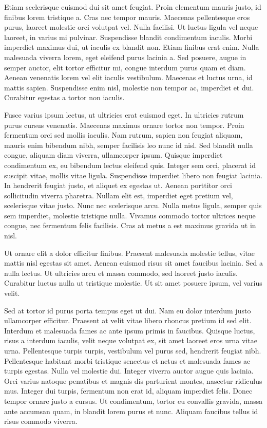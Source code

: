 Etiam scelerisque euismod dui sit amet feugiat. Proin elementum mauris justo, id finibus lorem tristique a. Cras nec tempor mauris. Maecenas pellentesque eros purus, laoreet molestie orci volutpat vel. Nulla facilisi. Ut luctus ligula vel neque laoreet, in varius mi pulvinar. Suspendisse blandit condimentum iaculis. Morbi imperdiet maximus dui, ut iaculis ex blandit non. Etiam finibus erat enim. Nulla malesuada viverra lorem, eget eleifend purus lacinia a. Sed posuere, augue in semper auctor, elit tortor efficitur mi, congue interdum purus quam et diam. Aenean venenatis lorem vel elit iaculis vestibulum. Maecenas et luctus urna, id mattis sapien. Suspendisse enim nisl, molestie non tempor ac, imperdiet et dui. Curabitur egestas a tortor non iaculis.

Fusce varius ipsum lectus, ut ultricies erat euismod eget. In ultricies rutrum purus cursus venenatis. Maecenas maximus ornare tortor non tempor. Proin fermentum orci sed mollis iaculis. Nam rutrum, sapien non feugiat aliquam, mauris enim bibendum nibh, semper facilisis leo nunc id nisl. Sed blandit nulla congue, aliquam diam viverra, ullamcorper ipsum. Quisque imperdiet condimentum ex, eu bibendum lectus eleifend quis. Integer sem orci, placerat id suscipit vitae, mollis vitae ligula. Suspendisse imperdiet libero non feugiat lacinia. In hendrerit feugiat justo, et aliquet ex egestas ut. Aenean porttitor orci sollicitudin viverra pharetra. Nullam elit est, imperdiet eget pretium vel, scelerisque vitae justo. Nunc nec scelerisque arcu. Nulla metus ligula, semper quis sem imperdiet, molestie tristique nulla. Vivamus commodo tortor ultrices neque congue, nec fermentum felis facilisis. Cras at metus a est maximus gravida ut in nisl.

Ut ornare elit a dolor efficitur finibus. Praesent malesuada molestie tellus, vitae mattis nisl egestas sit amet. Aenean euismod risus sit amet faucibus lacinia. Sed a nulla lectus. Ut ultricies arcu et massa commodo, sed laoreet justo iaculis. Curabitur luctus nulla ut tristique molestie. Ut sit amet posuere ipsum, vel varius velit.

Sed at tortor id purus porta tempus eget ut dui. Nam eu dolor interdum justo ullamcorper efficitur. Praesent at velit vitae libero rhoncus pretium id sed elit. Interdum et malesuada fames ac ante ipsum primis in faucibus. Quisque luctus, risus a interdum iaculis, velit neque volutpat ex, sit amet laoreet eros urna vitae urna. Pellentesque turpis turpis, vestibulum vel purus sed, hendrerit feugiat nibh. Pellentesque habitant morbi tristique senectus et netus et malesuada fames ac turpis egestas. Nulla vel molestie dui. Integer viverra auctor augue quis lacinia. Orci varius natoque penatibus et magnis dis parturient montes, nascetur ridiculus mus. Integer dui turpis, fermentum non erat id, aliquam imperdiet felis. Donec tempor ornare justo a cursus. Ut condimentum, tortor eu convallis gravida, massa ante accumsan quam, in blandit lorem purus et nunc. Aliquam faucibus tellus id risus commodo viverra.

